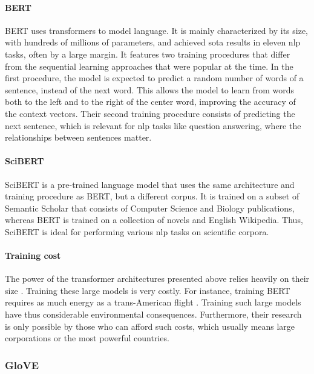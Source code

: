 \paragraph{BERT} \mbox{}

BERT \cite{devlin2018bert} uses transformers to model language. It is mainly characterized by its size, with hundreds of millions of parameters, and achieved \acrshort{sota} results in eleven \acrfull{nlp} tasks, often by a large margin. It features two training procedures that differ from the sequential learning approaches that were popular at the time. In the first procedure, the model is expected to predict a random number of words of a sentence, instead of the next word. This allows the model to learn from words both to the left and to the right of the center word, improving the accuracy of the context vectors. Their second training procedure consists of predicting the next sentence, which is relevant for \acrshort{nlp} tasks like question answering, where the relationships between sentences matter.

\paragraph{SciBERT} \mbox{}

SciBERT \cite{beltagy2019scibert} is a pre-trained language model that uses the same architecture and training procedure as BERT, but a different corpus. It is trained on a subset of Semantic Scholar that consists of Computer Science and Biology publications, whereas BERT is trained on a collection of novels and English Wikipedia. Thus, SciBERT is ideal for performing various \acrshort{nlp} tasks on scientific corpora.

\paragraph{Training cost} \mbox{}

The power of the transformer architectures presented above relies heavily on their size \cite{devlin2018bert}. Training these large models is very costly. For instance, training BERT requires as much energy as a trans-American flight \cite{bender2021dangers}. Training such large models have thus considerable environmental consequences. Furthermore, their research is only possible by those who can afford such costs, which usually means large corporations or the most powerful countries.

\subsubsection{GloVE}

